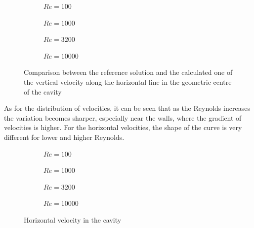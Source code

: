 \begin{figure}[h]
	\centering
	\begin{subfigure}{0.5\textwidth}
		\resizebox{1.4\textwidth}{!}{}
		\caption{$Re=100$}
	\end{subfigure}%
	\begin{subfigure}{0.5\textwidth}
		\resizebox{1.4\textwidth}{!}{}
		\caption{$Re=1000$}
	\end{subfigure}
	\begin{subfigure}{0.5\textwidth}
		\resizebox{1.4\textwidth}{!}{}
		\caption{$Re=3200$}
	\end{subfigure}%
	\begin{subfigure}{0.5\textwidth}
		\resizebox{1.4\textwidth}{!}{}
		\caption{$Re=10000$}
	\end{subfigure}
	\caption[Comparison between the reference solution and the calculated one of the vertical velocity along the horizontal line in the geometric center of the cavity]{Comparison between the reference solution and the calculated one of the vertical velocity along the horizontal line in the geometric centre of the cavity \cite{Ghia1982}}
	\label{Drivenvertical}
\end{figure}

As for the distribution of velocities, it can be seen that as the Reynolds increases the variation becomes sharper, especially near the walls, where the gradient of velocities is higher. For the horizontal velocities, the shape of the curve is very different for lower and higher Reynolds.

\begin{figure}[h]
	\centering
	\begin{subfigure}{0.5\textwidth}
		\resizebox{1.4\textwidth}{!}{}
		\caption{$Re=100$}
	\end{subfigure}%
	\begin{subfigure}{0.5\textwidth}
		\resizebox{1.4\textwidth}{!}{}
		\caption{$Re=1000$}
	\end{subfigure}
	\begin{subfigure}{0.5\textwidth}
		\resizebox{1.4\textwidth}{!}{}
		\caption{$Re=3200$}
	\end{subfigure}%
	\begin{subfigure}{0.5\textwidth}
		\resizebox{1.4\textwidth}{!}{}
		\caption{$Re=10000$}
	\end{subfigure}
	\caption{Horizontal velocity in the cavity}
	\label{DrivenHorizontalDomain}
\end{figure}

